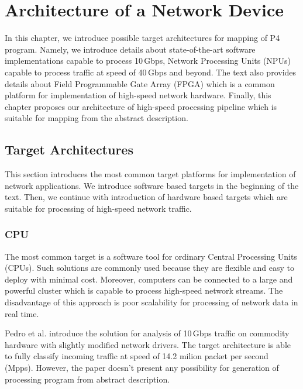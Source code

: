 \chapter{Architecture of a Network Device}
\label{chap:architectureOfNetworkDevice}

\begin{chapterintro}
In this chapter, we introduce possible target architectures for mapping of P4 program. 
Namely, we introduce details about state-of-the-art software implementations capable 
to process 10\,Gbps, Network Processing Units (NPUs) capable to process traffic at speed of 40\,Gbps and beyond. The text also provides details about
Field Programmable Gate Array (FPGA) which is a common platform for implementation of high-speed network hardware. 
Finally, this chapter proposes our architecture of high-speed processing pipeline which is suitable for mapping from the abstract description.
\end{chapterintro}

\section{Target Architectures}
This section introduces the most common target platforms for implementation of network applications. We introduce software based targets in the 
beginning of the text. Then, we continue with introduction of hardware based targets which are suitable for processing of high-speed network
traffic.


\subsection*{CPU}
The most common target is a software tool for ordinary Central Processing Units (CPUs). 
Such solutions are commonly used because they are flexible and easy to deploy with minimal 
cost. Moreover, computers can be connected to a large and powerful cluster which is capable to process high-speed network streams. 
The disadvantage of this approach is poor scalability for processing of network data in real time.

Pedro et al. \cite{SantiagodelRioWireSpeedCommodityHw}
introduce the solution for analysis of 10\,Gbps traffic on commodity hardware with slightly modified network drivers. 
The target architecture is able to fully classify incoming traffic at speed of 14.2 milion packet per second (Mpps). 
However, the paper doesn't present any possibility for generation of processing program from abstract description.

